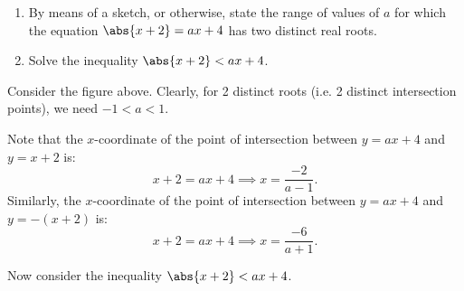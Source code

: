 \begin{problem}[\chili]
    \begin{enumerate}
        \item By means of a sketch, or otherwise, state the range of values of $a$ for which the equation $\abs{x + 2} = ax + 4$ has two distinct real roots.
        \item Solve the inequality $\abs{x + 2} < ax + 4$.
    \end{enumerate}
\end{problem}
\begin{solution}
    \begin{ppart}
        \begin{figure}[H]
            \centering
        \end{figure}
        Consider the figure above. Clearly, for 2 distinct roots (i.e. 2 distinct intersection points), we need $-1 < a < 1$.
    \end{ppart}
    \begin{ppart}
        Note that the $x$-coordinate of the point of intersection between $y = ax + 4$ and $y = x + 2$ is: \[x + 2 = ax + 4 \implies x = \frac{-2}{a-1}.\] Similarly, the $x$-coordinate of the point of intersection between $y = ax + 4$ and $y = -(x+2)$ is: \[x + 2 = ax + 4 \implies x = \frac{-6}{a+1}.\]

        Now consider the inequality $\abs{x + 2} < ax + 4$.


\end{ppart}
\end{solution}
